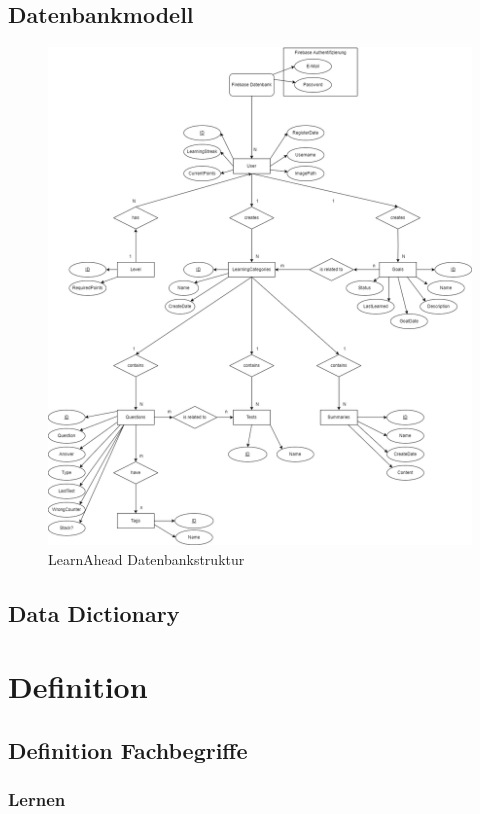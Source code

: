     \subsection{Datenbankmodell}
    \begin{figure}[H]
        \centering
        \includegraphics[width=1\textwidth]{images/LearnAheadDatenbankstruktur.png}
        \caption{LearnAhead Datenbankstruktur}
        \label{fig:LearnAheadDatenbankstruktur}
    \end{figure}\noindent

\subsection{Data Dictionary}

\section{Definition}
\subsection{Definition Fachbegriffe}
\subsubsection{Lernen}

